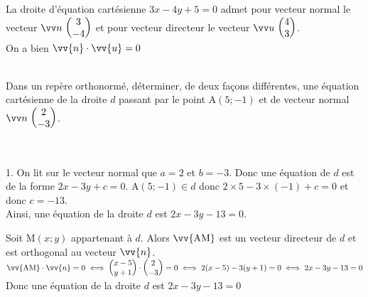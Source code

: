     \begin{exemple}
        La droite d'équation cartésienne $3 x-4 y+5=0$ admet pour vecteur normal le vecteur $\Coord{n}{3}{-4}$  et pour vecteur directeur le vecteur $\Coord{u}{4}{3}$.\\
        On a bien $\vv{n} \cdot \vv{u}=0$
    \end{exemple}
    
    \begin{methode}
        \\
        Dans un repère orthonormé, déterminer, de deux façons différentes, une équation cartésienne de la droite $d$ passant par le point $\mathrm{A}(5 ;-1)$ et de vecteur normal $\Coord{n}{2}{-3}$.
        
        \\
        \begin{enumMet}
            \item 1. On lit sur le vecteur normal que $a=2$ et $b=-3$.
            Donc une équation de $d$ est de la forme $2 x-3 y+c=0$. $\mathrm{A}(5 ;-1) \in d$ donc $2 \times 5-3 \times(-1)+c=0$ et donc $c=-13$.\\
            Ainsi, une équation de la droite $d$ est $2 x-3 y-13=0$.
            \item Soit $\mathrm{M}(x ;y)$ appartenant à $d .$ Alors $\vv{\mathrm{AM}}$ est un vecteur directeur de $d$ et est orthogonal au vecteur $\vv{n}$.\\
            $\vv{\mathrm{AM}} \cdot \vv{n}=0 \iff \CoordSV{x-5}{y+1} \cdot \CoordSV{2}{-3}=0 \iff 2(x-5)-3(y+1)=0 \iff 2 x-3 y-13=0$\\
            Donc une équation de la droite $d$ est $2 x-3 y-13=0$
        \end{enumMet}
    \end{methode}

